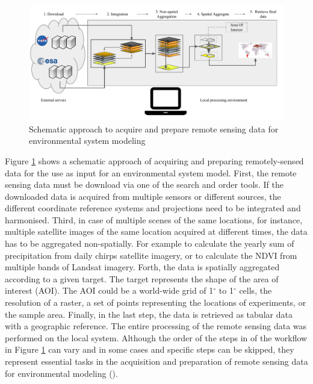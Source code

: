 \begin{center}
	\begin{figure}[h]
		\begin{center}
			\includegraphics[width=15cm]{images/traditional_acquisition-cropped.pdf}
			\caption{Schematic approach to acquire and prepare remote sensing data for environmental system modeling}
			\label{traditionl_approach}
		\end{center}
	\end{figure}
\end{center}


Figure \ref{traditionl_approach} shows a schematic approach of acquiring and preparing remotely-sensed data for the use as input for an environmental system model.
First, the remote sensing data must be download via one of the search and order tools. If the downloaded data is acquired from multiple sensors or different sources, the different coordinate reference systems and projections need to be integrated and harmonised. Third, in case of multiple scenes of the same locations, for instance, multiple satellite images of the same location acquired at different times, the data has to be aggregated non-spatially. For example to calculate the yearly sum of precipitation from daily chirps satellite imagery, or to calculate the NDVI from multiple bands of Landsat imagery.
Forth, the data is spatially aggregated according to a given target. The target represents the shape of the area of interest (AOI). The AOI could be a world-wide grid of 1$^\circ$ to 1$^\circ$ cells, the resolution of a raster, a set of points representing the locations of experiments, or the sample area. Finally, in the last step, the data is retrieved as tabular data with a geographic reference. The entire processing of the remote sensing data was performed on the local system.
Although the order of the steps in of the workflow in Figure \ref{traditionl_approach} can vary and in some cases and specific steps can be skipped, they represent essential tasks in the acquisition and preparation of remote sensing data for environmental modeling (\cite{iosifescu2011geovite}).

